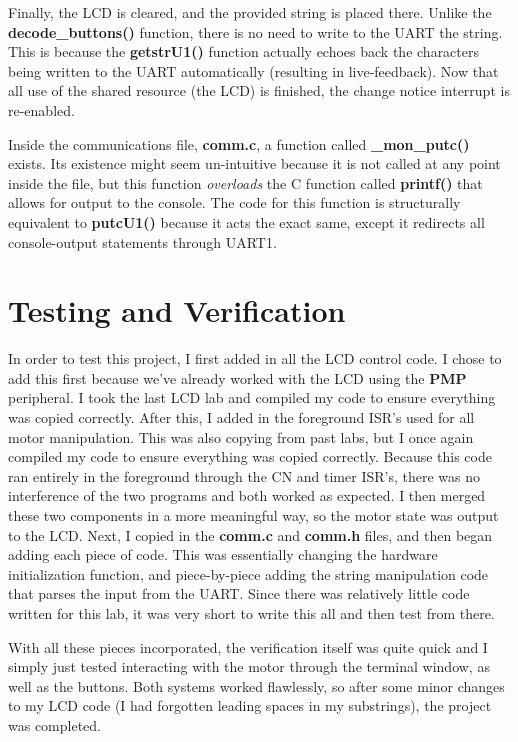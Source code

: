 \documentclass[a4paper, 12pt]{article}
\begin{document}
Finally, the LCD is cleared, and the provided string is placed there. Unlike the \textbf{decode\_buttons()} function, there is no need to write to the UART the string. This is because the \textbf{getstrU1()} function actually echoes back the characters being written to the UART automatically (resulting in live-feedback). Now that all use of the shared resource (the LCD) is finished, the change notice interrupt is re-enabled. 

Inside the communications file, \textbf{comm.c}, a function called \textbf{\_mon\_putc()} exists. Its existence might seem un-intuitive because it is not called at any point inside the file, but this function \textit{overloads} the C function called \textbf{printf()} that allows for output to the console. The code for this function is structurally equivalent to \textbf{putcU1()} because it acts the exact same, except it redirects all console-output statements through UART1.

\section{Testing and Verification}
In order to test this project, I first added in all the LCD control code. I chose to add this first because we've already worked with the LCD using the \textbf{PMP} peripheral. I took the last LCD lab and compiled my code to ensure everything was copied correctly. After this, I added in the foreground ISR's used for all motor manipulation. This was also copying from past labs, but I once again compiled my code to ensure everything was copied correctly. Because this code ran entirely in the foreground through the CN and timer ISR's, there was no interference of the two programs and both worked as expected. I then merged these two components in a more meaningful way, so the motor state was output to the LCD. Next, I copied in the \textbf{comm.c} and \textbf{comm.h} files, and then began adding each piece of code. This was essentially changing the hardware initialization function, and piece-by-piece adding the string manipulation code that parses the input from the UART. Since there was relatively little code written for this lab, it was very short to write this all and then test from there.

With all these pieces incorporated, the verification itself was quite quick and I simply just tested interacting with the motor through the terminal window, as well as the buttons. Both systems worked flawlessly, so after some minor changes to my LCD code (I had forgotten leading spaces in my substrings), the project was completed.
\end{document}
